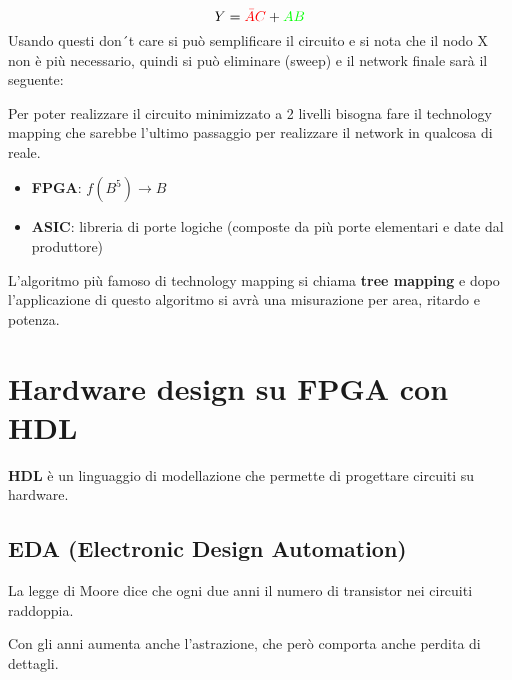 \documentclass[a4paper]{article}
\theoremstyle{break}
\theoremstyle{break}
\theoremstyle{break}
\theoremstyle{break}
\begin{document}
\[
  Y = \color{red} \bar{A}C \color{black} + \color{green} AB \color{black}
\] 
Usando questi don´t care si può semplificare il circuito e si nota che il nodo X non
è più necessario, quindi si può eliminare (sweep) e il network finale sarà il seguente:
\begin{figure}[H]
  \begin{center}
  \end{center}
\end{figure}

Per poter realizzare il circuito minimizzato a 2 livelli bisogna fare il technology mapping
che sarebbe l'ultimo passaggio per realizzare il network in qualcosa di reale.
\begin{itemize}
  \item \textbf{FPGA}: \( f(B^5) \to B \) 
  \item \textbf{ASIC}: libreria di porte logiche (composte da più porte elementari e date dal produttore)
\end{itemize}
L'algoritmo più famoso di technology mapping si chiama \textbf{tree mapping} e dopo l'applicazione
di questo algoritmo si avrà una misurazione per area, ritardo e potenza.


\section{Hardware design su FPGA con HDL}
\textbf{HDL} è un linguaggio di modellazione che permette di progettare circuiti su hardware.
\subsection{EDA (Electronic Design Automation)}
La legge di Moore dice che ogni due anni il numero di transistor nei circuiti raddoppia.

Con gli anni aumenta anche l'astrazione, che però comporta anche perdita di dettagli.
\end{document}

